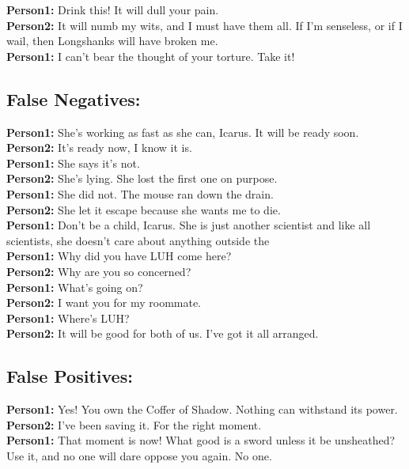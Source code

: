 \documentclass[
	letterpaper, %
	12pt, %
	unnumberedsections, %
	twoside, %
]{LTJournalArticle}
\begin{document}
\begin{appendices}
{		\noindent\textbf{Person1:}  Drink this! It will dull your pain. \\
		\noindent\textbf{Person2:}  It will numb my wits, and I must have them all. If I'm senseless, or if I wail, then Longshanks will have broken me. \\
		\noindent\textbf{Person1:}  I can't bear the thought of your torture. Take it! \\


	}

	\subsection{False Negatives:}
	{\ttfamily \tiny
		\noindent\textbf{Person1:}  She's working as fast as she can, Icarus.  It will be ready soon. \\
		\noindent\textbf{Person2:}  It's ready now, I know it is. \\
		\noindent\textbf{Person1:}  She says it's not. \\
		\noindent\textbf{Person2:}  She's lying.  She lost the first one on purpose. \\
		\noindent\textbf{Person1:}  She did not.  The mouse ran down the drain. \\
		\noindent\textbf{Person2:}  She let it escape because she wants me to die. \\
		\noindent\textbf{Person1:}  Don't be a child, Icarus.  She is just another scientist and like all scientists, she doesn't care about anything outside the \\

		\noindent\textbf{Person1:}  Why did you have LUH come here? \\
		\noindent\textbf{Person2:}  Why are you so concerned? \\
		\noindent\textbf{Person1:}  What's going on? \\
		\noindent\textbf{Person2:}  I want you for my roommate. \\
		\noindent\textbf{Person1:}  Where's LUH? \\
		\noindent\textbf{Person2:}  It will be good for both of us. I've got it all arranged. \\


	}

	\subsection{False Positives:}
	{\ttfamily \tiny
		\noindent\textbf{Person1:}  Yes! You own the Coffer of Shadow. Nothing can withstand its power. \\
		\noindent\textbf{Person2:}  I've been saving it. For the right moment. \\
		\noindent\textbf{Person1:}  That moment is now! What good is a sword unless it be unsheathed? Use it, and no one will dare oppose you again. No one. \\

}
\end{appendices}
\end{document}
